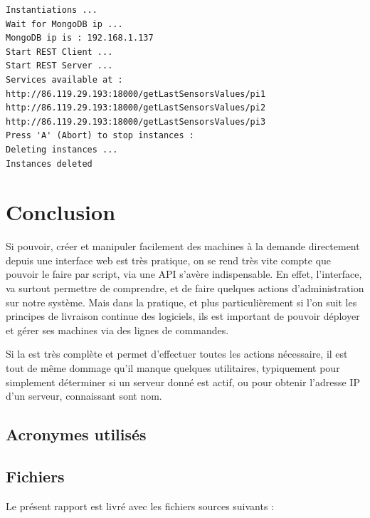 \documentclass[french]{msereport}
\begin{document}
		\begin{verbatim}
Instantiations ...
Wait for MongoDB ip ...
MongoDB ip is : 192.168.1.137
Start REST Client ...
Start REST Server ...
Services available at :
http://86.119.29.193:18000/getLastSensorsValues/pi1
http://86.119.29.193:18000/getLastSensorsValues/pi2
http://86.119.29.193:18000/getLastSensorsValues/pi3
Press 'A' (Abort) to stop instances :
Deleting instances ...
Instances deleted
		\end{verbatim}

	\section{Conclusion}
		Si pouvoir, créer et manipuler facilement des machines à la demande directement depuis une interface web est très pratique, on se rend très vite compte que pouvoir le faire par script, via une \acs{API} s'avère indispensable. En effet, l'interface, va surtout permettre de comprendre, et de faire quelques actions d'administration sur notre système. Mais dans la pratique, et plus particulièrement si l'on suit les principes de livraison continue des logiciels, ils est important de pouvoir déployer et gérer ses machines via des lignes de commandes.

		Si la  est très complète et permet d'effectuer toutes les actions nécessaire, il est tout de même dommage qu'il manque quelques utilitaires, typiquement pour simplement déterminer si un serveur donné est actif, ou pour obtenir l'adresse \acs{IP} d'un serveur, connaissant sont nom.

	\appendixsection

		\listoffigures

		\subsection{Acronymes utilisés}
			\begin{acronym}
			\end{acronym}
			
		\subsection{Fichiers}
			Le présent rapport est livré avec les fichiers sources suivants :
			
\end{document}
